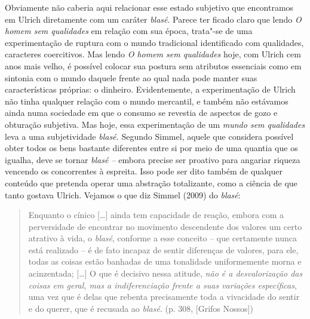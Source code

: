 Obviamente não caberia aqui relacionar esse estado subjetivo que
encontramos em Ulrich diretamente com um caráter \emph{blasé}. Parece
ter ficado claro que lendo \emph{O homem sem qualidades} em relação com
sua época, trata"-se de uma experimentação de ruptura com o mundo
tradicional identificado com qualidades, caracteres coercitivos. Mas
lendo \emph{O homem sem qualidades} hoje, com Ulrich cem anos mais
velho, é possível colocar sua postura sem atributos essenciais como em
sintonia com o mundo daquele frente ao qual nada pode manter suas
características próprias: o dinheiro. Evidentemente, a experimentação de
Ulrich não tinha qualquer relação com o mundo mercantil, e também não
estávamos ainda numa sociedade em que o consumo se revestia de aspectos
de gozo e obturação subjetiva. Mas hoje, essa experimentação de um
\emph{mundo sem qualidades} leva a uma subjetividade \emph{blasé.}
Segundo Simmel, aquele que considera possível obter todos os bens
bastante diferentes entre si por meio de uma quantia que os igualha,
deve se tornar \emph{blasé --} embora precise ser proativo para angariar
riqueza vencendo os concorrentes à espreita. Isso pode ser dito também
de qualquer conteúdo que pretenda operar uma abstração totalizante, como
a ciência de que tanto gostava Ulrich. Vejamos o que diz Simmel (2009)
do \emph{blasé}:

\begin{quote}
Enquanto o cínico [\ldots{}] ainda tem capacidade de reação, embora
com a perversidade de encontrar no movimento descendente dos valores um
certo atrativo à vida, o \emph{blasé}, conforme a esse conceito -- que
certamente nunca está realizado -- é de fato incapaz de sentir
diferenças de valores, para ele, todas as coisas estão banhadas de uma
tonalidade uniformemente morna e acinzentada; [\ldots{}] O que é
decisivo nessa atitude, \emph{não é a desvalorização das coisas em
geral, mas a indiferenciação frente a suas variações específicas}, uma
vez que é delas que rebenta precisamente toda a vivacidade do sentir e
do querer, que é recusada ao \emph{blasé}. (p. 308, [Grifos Nossos])
\end{quote}

